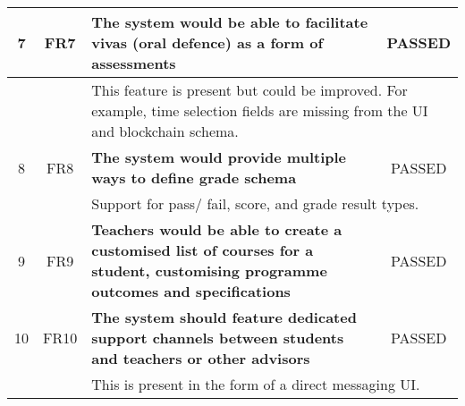 \begin{table}[!ht]
\begin{tabularx}{\textwidth}{|c|c|X|c|}
		\hline
		7                                                                 & FR7                     & \textbf{The system would be able to facilitate vivas (oral defence) as a form of assessments}                                                         & \cellcolor{green}PASSED \\
		\hline
		                                                                  &                         & \multicolumn{2}{X|}{This feature is present but could be improved. For example, time selection fields are missing from the UI and blockchain schema.}                           \\
		\hline
		8                                                                 & FR8                     & \textbf{The system would provide multiple ways to define
		grade schema}                                                     & \cellcolor{green}PASSED                                                                                                                                                                                   \\
		\hline
		                                                                  &                         & \multicolumn{2}{X|}{Support for pass/ fail, score, and grade result types.}                                                                                                     \\
		\hline
		9                                                                 & FR9                     & \textbf{Teachers would be able to create a customised list of courses
		for a student, customising programme outcomes and specifications} & \cellcolor{green}PASSED                                                                                                                                                                                   \\
		\hline
		10                                                                & FR10                    & \textbf{The system should feature dedicated support channels
		between students and teachers or other advisors}                  & \cellcolor{green}PASSED                                                                                                                                                                                   \\
		\hline
		                                                                  &                         & \multicolumn{2}{X|}{This is present in the form of a direct messaging UI.}                                                                                                      \\

\end{tabularx}
\end{table}
